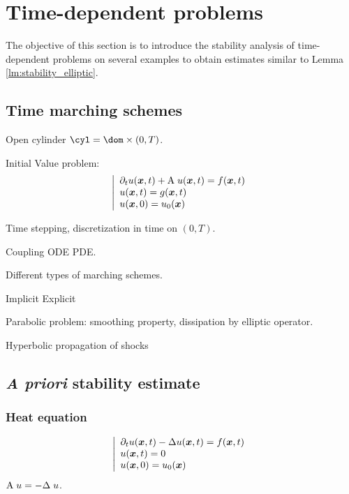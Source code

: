 
\chapter{Time-dependent problems}\label{chap:td}

The objective of this section is to introduce the \apriori stability analysis of time-dependent problems on several examples to obtain estimates similar to Lemma \ref{lm:stability_elliptic}.

\section{Time marching schemes}

Open cylinder $\cyl = \dom \times (0,T)$.

Initial Value problem:
\begin{equation*}
\left\lvert
\begin{array}{l}
\partial_t u({{\boldsymbol x}},t) + {\mathrm A}\;u({{\boldsymbol x}},t) = f({{\boldsymbol x}},t) \\
u({{\boldsymbol x}},t) = g({{\boldsymbol x}},t) \\
u({{\boldsymbol x}},0) = u_0({{\boldsymbol x}})
\end{array}
\right.
\end{equation*}

Time stepping, discretization in time on $(0,T)$.

Coupling ODE PDE.

Different types of marching schemes.

Implicit
Explicit

Parabolic problem: smoothing property, dissipation by elliptic operator.

Hyperbolic propagation of shocks



\section{\textit{A priori} stability estimate}

\subsection{Heat equation}

\begin{equation*}
\left\lvert
\begin{array}{l}
\partial_t u({{\boldsymbol x}},t) - \Delta u({{\boldsymbol x}},t) = f({{\boldsymbol x}},t) \\
u({{\boldsymbol x}},t) = 0 \\
u({{\boldsymbol x}},0) = u_0({{\boldsymbol x}})
\end{array}
\right.
\end{equation*}
${\mathrm A}\;u = - \Delta\;u$.

